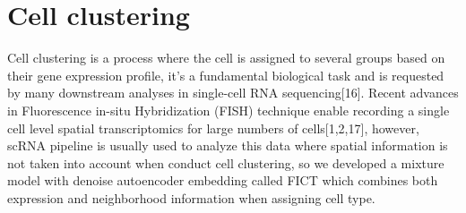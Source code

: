 \section{Cell clustering}
Cell clustering is a process where the cell is assigned to several groups based on their gene expression profile, it’s a fundamental biological task and is requested by many downstream analyses in single-cell RNA sequencing[16]. Recent advances in Fluorescence in-situ Hybridization (FISH) technique enable recording a single cell level spatial transcriptomics for large numbers of cells[1,2,17], however, scRNA pipeline is usually used to analyze this data where spatial information is not taken into account when conduct cell clustering, so we developed a mixture model with denoise autoencoder embedding called FICT which combines both expression and neighborhood information when assigning cell type.
